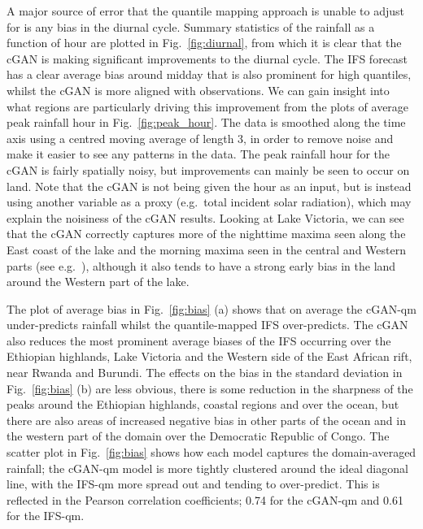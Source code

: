 \documentclass{article}
\begin{document}
A major source of error that the quantile mapping approach is unable to adjust for is any bias in the diurnal cycle. Summary statistics of the rainfall as a function of hour are plotted in Fig.~\ref{fig:diurnal}, from which it is clear that the cGAN is making significant improvements to the diurnal cycle. The IFS forecast has a clear average bias around midday that is also prominent for high quantiles, whilst the cGAN is more aligned with observations. We can gain insight into what regions are particularly driving this improvement from the plots of average peak rainfall hour in Fig.~\ref{fig:peak_hour}. The data is smoothed along the time axis using a centred moving average of length 3, in order to remove noise and make it easier to see any patterns in the data. The peak rainfall hour for the cGAN is fairly spatially noisy, but improvements can mainly be seen to occur on land. Note that the cGAN is not being given the hour as an input, but is instead using another variable as a proxy (e.g.~total incident solar radiation), which may explain the noisiness of the cGAN results. Looking at Lake Victoria, we can see that the cGAN correctly captures more of the nighttime maxima seen along the East coast of the lake and the morning maxima seen in the central and Western parts (see e.g.~\cite{woodhams_identifying_2019}), although it also tends to have a strong early bias in the land around the Western part of the lake.


The plot of average bias in Fig.~\ref{fig:bias} (a) shows that on average the cGAN-qm under-predicts rainfall whilst the quantile-mapped IFS over-predicts. The cGAN also reduces the most prominent average biases of the IFS occurring over the Ethiopian highlands, Lake Victoria and the Western side of the East African rift, near Rwanda and Burundi. The effects on the bias in the standard deviation in Fig.~\ref{fig:bias} (b) are less obvious, there is some reduction in the sharpness of the peaks around the Ethiopian highlands, coastal regions and over the ocean, but there are also areas of increased negative bias in other parts of the ocean and in the western part of the domain over the Democratic Republic of Congo. The scatter plot in Fig.~\ref{fig:bias} shows how each model captures the domain-averaged rainfall; the cGAN-qm model is more tightly clustered around the ideal diagonal line, with the IFS-qm more spread out and tending to over-predict. This is reflected in the Pearson correlation coefficients; 0.74 for the cGAN-qm and 0.61 for the IFS-qm.
\end{document}
